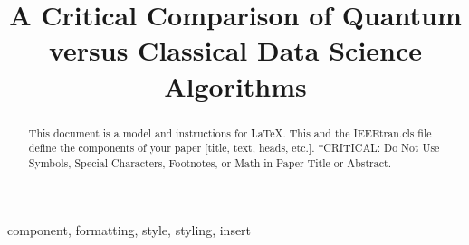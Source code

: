 \documentclass[conference]{IEEEtran}
\begin{document}
\title{A Critical Comparison of Quantum versus Classical Data Science
Algorithms\\


}

\author{


}

\maketitle

\begin{abstract}
This document is a model and instructions for \LaTeX.
This and the IEEEtran.cls file define the components of your paper [title, text, heads, etc.]. *CRITICAL: Do Not Use Symbols, Special Characters, Footnotes, 
or Math in Paper Title or Abstract.
\end{abstract}

\begin{IEEEkeywords}
component, formatting, style, styling, insert
\end{IEEEkeywords}
\end{document}
